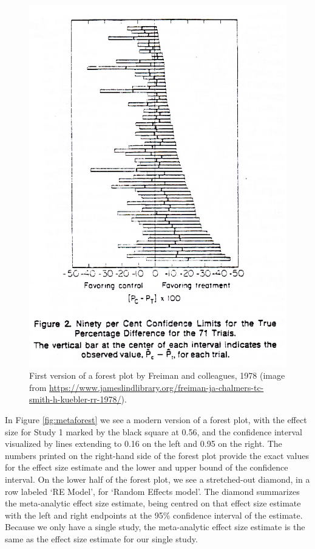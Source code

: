 \documentclass[
  oneside]{krantz}
\begin{document}
\begin{figure}

{\centering \includegraphics[width=1\linewidth]{images/freiman1978} 

}

\caption{First version of a forest plot by Freiman and colleagues, 1978 (image from \url{https://www.jameslindlibrary.org/freiman-ja-chalmers-tc-smith-h-kuebler-rr-1978/}).}\label{fig:freiman1978}
\end{figure}

In Figure \ref{fig:metaforest} we see a modern version of a forest plot, with the effect size for Study 1 marked by the black square at 0.56, and the confidence interval visualized by lines extending to 0.16 on the left and 0.95 on the right. The numbers printed on the right-hand side of the forest plot provide the exact values for the effect size estimate and the lower and upper bound of the confidence interval. On the lower half of the forest plot, we see a stretched-out diamond, in a row labeled `RE Model', for `Random Effects model'. The diamond summarizes the meta-analytic effect size estimate, being centred on that effect size estimate with the left and right endpoints at the 95\% confidence interval of the estimate. Because we only have a single study, the meta-analytic effect size estimate is the same as the effect size estimate for our single study.
\end{document}
